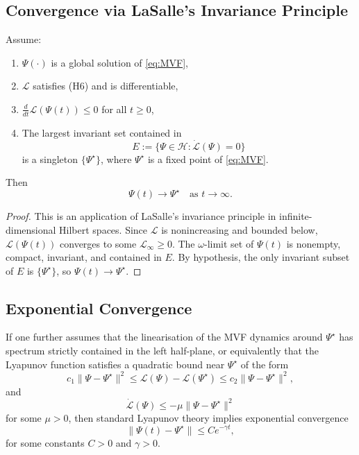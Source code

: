 \documentclass[11pt]{article}
\begin{document}
\subsection{Convergence via LaSalle's Invariance Principle}

\begin{theorem}
Assume:
\begin{enumerate}
  \item $\Psi(\cdot)$ is a global solution of \eqref{eq:MVF},
  \item $\mathcal{L}$ satisfies (H6) and is differentiable,
  \item $\frac{d}{dt}\mathcal{L}(\Psi(t))\le 0$ for all $t\ge 0$,
  \item The largest invariant set contained in
        \[
          E := \{\Psi\in\mathcal{H} : \dot{\mathcal{L}}(\Psi)=0\}
        \]
        is a singleton $\{\Psi^\star\}$, where $\Psi^\star$ is a fixed point of \eqref{eq:MVF}.
\end{enumerate}
Then
\[
  \Psi(t)\to \Psi^\star \quad \text{as } t\to\infty.
\]
\end{theorem}

\begin{proof}
This is an application of LaSalle's invariance principle in infinite-dimensional Hilbert spaces. Since $\mathcal{L}$ is nonincreasing and bounded below, $\mathcal{L}(\Psi(t))$ converges to some $\mathcal{L}_\infty\ge 0$. The $\omega$-limit set of $\Psi(t)$ is nonempty, compact, invariant, and contained in $E$. By hypothesis, the only invariant subset of $E$ is $\{\Psi^\star\}$, so $\Psi(t)\to\Psi^\star$.
\end{proof}

\subsection{Exponential Convergence}

If one further assumes that the linearisation of the MVF dynamics around $\Psi^\star$ has spectrum strictly contained in the left half-plane, or equivalently that the Lyapunov function satisfies a quadratic bound near $\Psi^\star$ of the form
\[
  c_1\|\Psi-\Psi^\star\|^2 \le \mathcal{L}(\Psi)-\mathcal{L}(\Psi^\star)
  \le c_2\|\Psi-\Psi^\star\|^2,
\]
and
\[
  \dot{\mathcal{L}}(\Psi)\le -\mu \|\Psi-\Psi^\star\|^2
\]
for some $\mu>0$, then standard Lyapunov theory implies exponential convergence
\[
  \|\Psi(t)-\Psi^\star\| \le C e^{-\gamma t},
\]
for some constants $C>0$ and $\gamma>0$.
\end{document}
